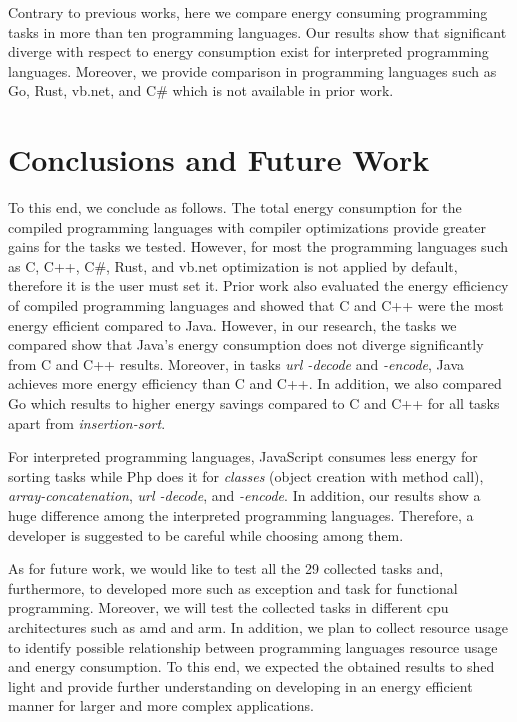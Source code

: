 Contrary to previous works, here we compare energy consuming 
programming tasks in more than ten programming languages.
Our results show that significant diverge with respect to 
energy consumption exist for interpreted programming languages. 
Moreover, we provide comparison in programming languages such 
as Go, Rust, {\sc vb.net}, and C\# which is not available in 
prior work.


\section{Conclusions and Future Work} \label{conclusiona_and_future_work}



To this end, we conclude as follows. 
The total energy consumption for the compiled programming languages 
with compiler optimizations provide greater gains for the tasks 
we tested. 
However, for most the programming languages such as C, C++, C\#, 
Rust, and {\sc vb.net} optimization is not applied by default, 
therefore it is the user must set it.  
Prior work \cite{abdulsalam_program_2014, chen_android_2016} 
also evaluated the energy efficiency of compiled programming languages 
and showed that C and C++ were the most energy efficient compared 
to Java. 
However, in our research, the tasks we compared show that Java's 
energy consumption does not diverge significantly from C and C++ 
results. 
Moreover, in tasks \textit{url -decode} and \textit{-encode}, Java 
achieves more energy efficiency than C and C++.
In addition, we also compared Go which results to higher energy 
savings compared to C and C++ for all tasks apart from 
\textit{insertion-sort}.

For interpreted programming languages, JavaScript consumes less 
energy for sorting tasks while Php does it for \textit{classes} 
(object creation with method call), \textit{array-concatenation}, 
\textit{url -decode}, and \textit{-encode}. 
In addition, our results show a huge difference among the interpreted 
programming languages. 
Therefore, a developer is suggested to be careful while choosing 
among them.

As for future work, we would like to test all the 29 collected 
tasks and, furthermore, to developed more such as exception 
and task for functional programming. 
Moreover, we will test the collected tasks in different {\sc cpu} 
architectures such as {\sc amd} and {\sc arm}. 
In addition, we plan to collect resource usage to identify 
possible relationship between programming languages resource 
usage and energy consumption. 
To this end, we expected the obtained results to shed light 
and provide further understanding on developing in an energy 
efficient manner for larger and  more complex applications.



